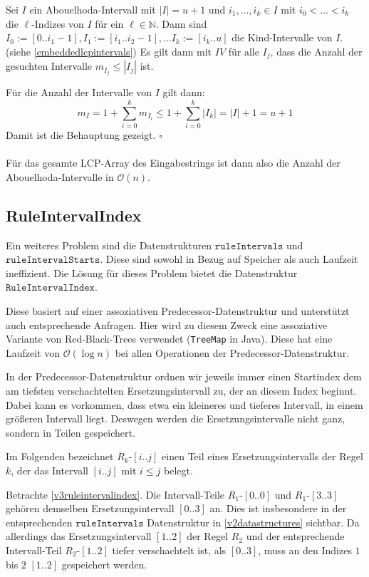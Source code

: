 Sei $I$ ein Abouelhoda-Intervall mit $|I| = u+1$ und $i_1, \dots, i_k \in I$ mit $i_0 < \dots < i_k$ die $\ell$-Indizes von $I$ für ein $\ell \in \mathbb{N}$. Dann sind $I_0 := [0..i_1-1], I_1 := [i_1..i_2-1], \dots I_k := [i_k..u]$ die Kind-Intervalle von $I$. (siehe \autoref{embeddedlcpintervals}) Es gilt dann mit $IV$ für alle $I_j$, dass die Anzahl der gesuchten Intervalle $m_{I_j} \leq |I_j|$ ist.

Für die Anzahl der Intervalle von $I$ gilt dann:
\begin{equation*}
    m_I = 1 + \sum_{i=0}^k m_{I_i} \leq 1 + \sum_{i=0}^k |I_k| = |I| + 1 = u + 1
\end{equation*}
Damit ist die Behauptung gezeigt. $\square$\\\\
Für das gesamte LCP-Array des Eingabestrings ist dann also die Anzahl der Abouelhoda-Intervalle in $\mathcal{O}(n)$. 

\subsection{RuleIntervalIndex}
\label{riiv3}

Ein weiteres Problem sind die Datenstrukturen $\texttt{ruleIntervals}$ und $\texttt{ruleIntervalStarts}$. Diese sind sowohl in Bezug auf Speicher als auch Laufzeit ineffizient. Die Lösung für dieses Problem bietet die Datenstruktur $\texttt{RuleIntervalIndex}$.

Diese basiert auf einer assoziativen Predecessor-Datenstruktur \cite{dinklage_engineering_2021} und unterstützt auch entsprechende Anfragen. Hier wird zu diesem Zweck eine assoziative Variante von Red-Black-Trees \cite{bayer_symmetric_1972, guibas_dichromatic_1978} verwendet (\texttt{TreeMap} in Java). Diese hat eine Laufzeit von $\mathcal{O}(\log n)$ bei allen Operationen der Predecessor-Datenstruktur. 

In der Predecessor-Datenstruktur ordnen wir jeweils immer einen Startindex dem am tiefsten verschachtelten Ersetzungsintervall zu, der an diesem Index beginnt. Dabei kann es vorkommen, dass etwa ein kleineres und tieferes Intervall, in einem größeren Intervall liegt. Deswegen werden die Ersetzungsintervalle nicht ganz, sondern in Teilen gespeichert.

Im Folgenden bezeichnet $R_k$-$[i..j]$ einen Teil eines Ersetzungsintervalls der Regel $k$, der das Intervall $[i..j]$ mit $i \leq j$ belegt. 

Betrachte \autoref{v3ruleintervalindex}. Die Intervall-Teile $R_1$-$[0..0]$ und $R_1$-$[3..3]$ gehören demselben Ersetzungsintervall $[0..3]$ an. Dies ist insbesondere in der entsprechenden $\texttt{ruleIntervals}$ Datenstruktur in \autoref{v2datastructures} sichtbar. Da allerdings das Ersetzungsintervall $[1..2]$ der Regel $R_2$ und der entsprechende Intervall-Teil $R_2$-$[1..2]$ tiefer verschachtelt ist, als $[0..3]$, muss an den Indizes $1$ bis $2$ $[1..2]$ gespeichert werden.

